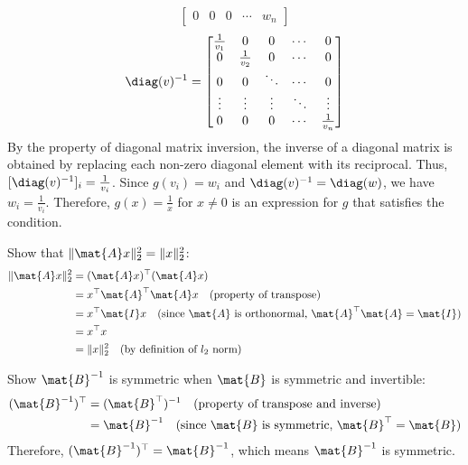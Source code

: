 \documentclass{article}
\begin{document}
\begin{aprob}
\begin{tcolorbox}[colback=lightgray!10!white, colframe=black, title=A8.a]
\[\begin{bmatrix}
            0 & 0 & 0 & \cdots & w_n
            \end{bmatrix}
        \]
        \[
            \diag(v)^{-1} = \begin{bmatrix} 
            \frac{1}{v_1} & 0 & 0 & \cdots & 0 \\
            0 & \frac{1}{v_2} & 0 & \cdots & 0 \\
            0 & 0 & \ddots & \cdots & 0 \\
            \vdots & \vdots & \vdots & \ddots & \vdots \\
            0 & 0 & 0 & \cdots & \frac{1}{v_n}
            \end{bmatrix}
        \]
        By the property of diagonal matrix inversion, the inverse of a diagonal matrix is obtained by replacing each non-zero diagonal element with its reciprocal. Thus, $[\diag(v)^{-1}]_{i} = \frac{1}{v_i}$.
        Since $g(v_i) = w_i$ and $\diag(v)^{-1} = \diag(w)$, we have $w_i = \frac{1}{v_i}$.
        Therefore, $g(x) = \frac{1}{x}$ for $x \neq 0$ is an expression for $g$ that satisfies the condition.
    \end{tcolorbox}
    \begin{tcolorbox}[colback=lightgray!10!white, colframe=black, title=A8.b]
        Show that $\|\mat{A}x\|_2^2 = \|x\|_2^2$:
        \begin{align*}
        \|\mat{A}x\|_2^2 &= (\mat{A}x)^\top(\mat{A}x) \\
        &= x^\top\mat{A}^\top\mat{A}x \quad \text{(property of transpose)} \\
        &= x^\top\mat{I}x \quad \text{(since $\mat{A}$ is orthonormal, $\mat{A}^\top\mat{A} = \mat{I}$)} \\
        &= x^\top x \\
        &= \|x\|_2^2 \quad \text{(by definition of $l_2$ norm)}
        \end{align*}
        \end{tcolorbox}
    \begin{tcolorbox}[colback=lightgray!10!white, colframe=black, title=A8.c]
        Show $\mat{B}^{-1}$ is symmetric when $\mat{B}$ is symmetric and invertible:
        \begin{align*}
            (\mat{B}^{-1})^\top &= (\mat{B}^\top)^{-1} \quad \text{(property of transpose and inverse)}\\
            &= \mat{B}^{-1} \quad \text{(since $\mat{B}$ is symmetric, $\mat{B}^\top = \mat{B}$)}
        \end{align*}
        Therefore, $(\mat{B}^{-1})^\top = \mat{B}^{-1}$, which means $\mat{B}^{-1}$ is symmetric.
    \end{tcolorbox}


\end{aprob}
\end{document}
